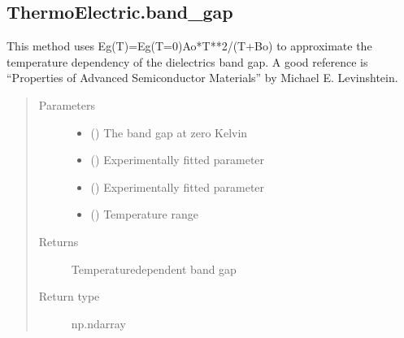 \documentclass[letterpaper,10pt,english]{sphinxmanual}
\begin{document}
\subsection{ThermoElectric.band\_gap}
\label{\detokenize{autosummary/ThermoElectric.band_gap:thermoelectric-band-gap}}\label{\detokenize{autosummary/ThermoElectric.band_gap::doc}}

\begin{fulllineitems}
\label{\detokenize{autosummary/ThermoElectric.band_gap:ThermoElectric.band_gap}}
\sphinxAtStartPar
This method uses Eg(T)=Eg(T=0)\sphinxhyphen{}Ao*T**2/(T+Bo) to approximate the temperature dependency of the dielectrics band gap.
A good reference is “Properties of Advanced Semiconductor Materials” by Michael E. Levinshtein.
\begin{quote}\begin{description}
\item[{Parameters}] \leavevmode\begin{itemize}
\item {} 
\sphinxAtStartPar
{} () \textendash{} The band gap at zero Kelvin

\item {} 
\sphinxAtStartPar
{} () \textendash{} Experimentally fitted parameter

\item {} 
\sphinxAtStartPar
{} () \textendash{} Experimentally fitted parameter

\item {} 
\sphinxAtStartPar
{} () \textendash{} Temperature range

\end{itemize}

\item[{Returns}] \leavevmode
\sphinxAtStartPar
{} \textendash{} Temperature\sphinxhyphen{}dependent band gap

\item[{Return type}] \leavevmode
\sphinxAtStartPar
np.ndarray

\end{description}\end{quote}

\end{fulllineitems}
\end{document}
